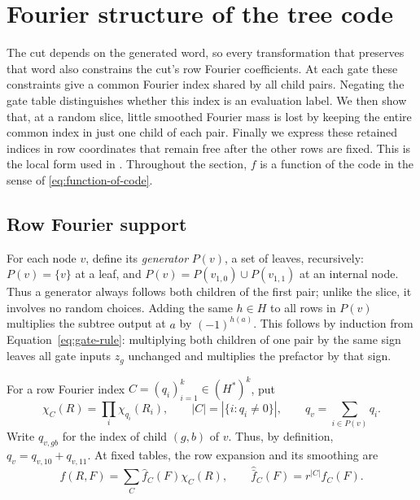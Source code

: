 \section{Fourier structure of the tree code}\label{sec:tree-fourier}

The cut depends on the generated word, so every transformation that
preserves that word also constrains the cut's row Fourier coefficients.
At each gate these constraints give a common Fourier index shared by
all child pairs. Negating the gate table distinguishes whether this
index is an evaluation label. We then show that, at a random slice,
little smoothed Fourier mass is lost by keeping the entire common index
in just one child of each pair. Finally we express these retained
indices in row coordinates that remain free after the other rows are
fixed. This is the local form used in .
Throughout the section, $f$ is a function of the code in the sense of
\eqref{eq:function-of-code}.

\subsection{Row Fourier support}

For each node $v$, define its \emph{generator} $P(v)$, a set of leaves,
recursively: $P(v)=\{v\}$ at a leaf, and
$P(v)=P(v_{1,0})\cup P(v_{1,1})$ at an internal node.
Thus a generator always follows both children of the first pair;
unlike the slice, it involves no random choices.
Adding the same $h\in H$ to all rows in $P(v)$ multiplies the
subtree output at $a$ by $(-1)^{h(a)}$.  This follows by induction
from Equation~\eqref{eq:gate-rule}: multiplying both children of
one pair by the same sign leaves all gate inputs $z_g$ unchanged
and multiplies the prefactor by that sign.

For a row Fourier index $C=(q_i)_{i=1}^k\in(H^*)^k$, put
\[
 \chi_C(R)=\prod_i\chi_{q_i}(R_i),\qquad
 |C|=|\{i:q_i\ne0\}|,\qquad
 q_v=\sum_{i\in P(v)}q_i.
\]
Write $q_{v,gb}$ for the index of child $(g,b)$ of $v$.
Thus, by definition, $q_v=q_{v,10}+q_{v,11}$.
At fixed tables, the row expansion and its smoothing are
\begin{equation}
 f(R,F)=\sum_C\widehat f_C(F)\chi_C(R),\qquad
 \widehat{\bar f}_C(F)=r^{|C|}\widehat f_C(F).
 \label{eq:row-smoothing}
\end{equation}


